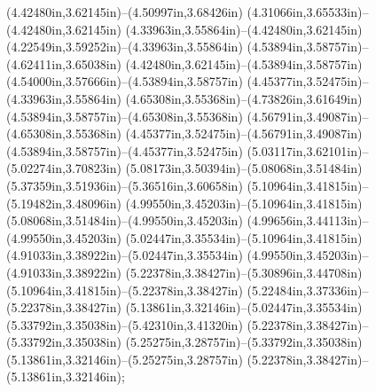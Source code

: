 (4.42480in,3.62145in)--(4.50997in,3.68426in) (4.31066in,3.65533in)--(4.42480in,3.62145in) (4.33963in,3.55864in)--(4.42480in,3.62145in) (4.22549in,3.59252in)--(4.33963in,3.55864in) (4.53894in,3.58757in)--(4.62411in,3.65038in) (4.42480in,3.62145in)--(4.53894in,3.58757in) (4.54000in,3.57666in)--(4.53894in,3.58757in) (4.45377in,3.52475in)--(4.33963in,3.55864in) (4.65308in,3.55368in)--(4.73826in,3.61649in) (4.53894in,3.58757in)--(4.65308in,3.55368in) (4.56791in,3.49087in)--(4.65308in,3.55368in) (4.45377in,3.52475in)--(4.56791in,3.49087in) (4.53894in,3.58757in)--(4.45377in,3.52475in) (5.03117in,3.62101in)--(5.02274in,3.70823in) (5.08173in,3.50394in)--(5.08068in,3.51484in) (5.37359in,3.51936in)--(5.36516in,3.60658in) (5.10964in,3.41815in)--(5.19482in,3.48096in) (4.99550in,3.45203in)--(5.10964in,3.41815in) (5.08068in,3.51484in)--(4.99550in,3.45203in) (4.99656in,3.44113in)--(4.99550in,3.45203in) (5.02447in,3.35534in)--(5.10964in,3.41815in) (4.91033in,3.38922in)--(5.02447in,3.35534in) (4.99550in,3.45203in)--(4.91033in,3.38922in) (5.22378in,3.38427in)--(5.30896in,3.44708in) (5.10964in,3.41815in)--(5.22378in,3.38427in) (5.22484in,3.37336in)--(5.22378in,3.38427in) (5.13861in,3.32146in)--(5.02447in,3.35534in) (5.33792in,3.35038in)--(5.42310in,3.41320in) (5.22378in,3.38427in)--(5.33792in,3.35038in) (5.25275in,3.28757in)--(5.33792in,3.35038in) (5.13861in,3.32146in)--(5.25275in,3.28757in) (5.22378in,3.38427in)--(5.13861in,3.32146in);
